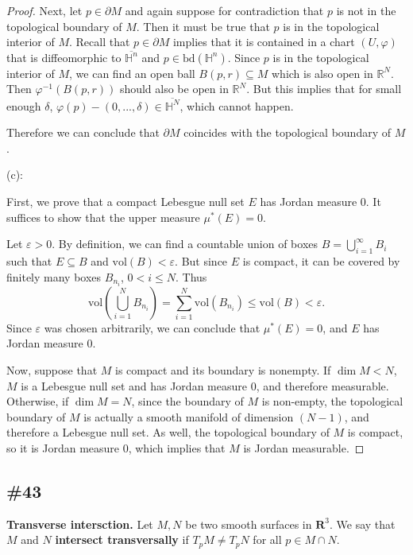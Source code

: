 \documentclass{article}
\newcommand{\R}{\mathbf{R}}
\newcommand{\vol}{\mathrm{vol}}
\theoremstyle{plain} %
\numberwithin{thm}{section} %
\theoremstyle{definition}
\begin{document}
\begin{proof}
            Next, let \(p \in \partial M\) and again suppose for contradiction that \(p\) is not in the topological boundary of \(M\). Then it must be true that \(p\) is in the topological interior of \(M\). Recall that \(p \in \partial M\) implies that it is contained in a chart \((U, \varphi)\) that is diffeomorphic to \(\overline{\mathbb{H}^n}\) and \(p \in \mathrm{bd} (\mathbb{H}^n)\). Since \(p\) is in the topological interior of \(M\), we can find an open ball \(B(p, r) \subseteq M\) which is also open in \(\mathbb{R}^N\). Then \(\varphi ^{-1}(B(p,r))\) should also be open in \(\mathbb{R}^N\). But this implies that for small enough \(\delta\), \(\varphi (p) - (0, ..., \delta) \in \overline{\mathbb{H}^N}\), which cannot happen.

            \smallskip

            Therefore we can conclude that \(\partial M\) coincides with the topological boundary of \(M\).

            \medskip

            (c):

            First, we prove that a compact Lebesgue null set \(E\) has Jordan measure 0. It suffices to show that the upper measure \(\mu ^* (E) = 0\).

            Let \(\varepsilon > 0\). By definition, we can find a countable union of boxes \(B = \bigcup_{i=1}^{\infty} B_i\) such that \(E \subseteq B\) and \(\vol(B) < \varepsilon\). But since \(E\) is compact, it can be covered by finitely many boxes \(B_{n_i}\), \(0 < i \leq N\). Thus
            \[
                \vol\left( \bigcup_{i=1}^{N} B_{n_i} \right) = \sum_{i=1}^{N} \vol(B_{n_i}) \leq \vol(B) < \varepsilon.
            \]
            Since \(\varepsilon\) was chosen arbitrarily, we can conclude that \(\mu ^* (E) = 0\), and \(E\) has Jordan measure 0.

            Now, suppose that \(M\) is compact and its boundary is nonempty. If \(\dim M < N\), \(M\) is a Lebesgue null set and has Jordan measure 0, and therefore measurable. Otherwise, if \(\dim M = N\), since the boundary of \(M\) is non-empty, the topological boundary of \(M\) is actually a smooth manifold of dimension \((N-1)\), and therefore a Lebesgue null set. As well, the topological boundary of \(M\) is compact, so it is Jordan measure 0, which implies that \(M\) is Jordan measurable.
        \end{proof}
        \newpage
        \subsection{\#43}
        \textbf{Transverse intersction.} Let $M,N$ be two smooth surfaces in $\R^3$. We say that $M$ and $N$ \textbf{intersect transversally} if $T_pM\neq T_pN$ for all $p\in M\cap N$.
    
\end{document}
